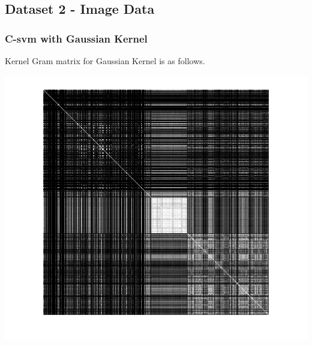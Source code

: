 \documentclass{article}
\begin{document}
\subsection{Dataset 2 - Image Data}

\subsubsection{C-svm with Gaussian Kernel}
Kernel Gram matrix for Gaussian Kernel is as follows.
\begin{center}
\includegraphics[scale=1]{Classification/2/c_g/kgm}
\end{center}
\end{document}
